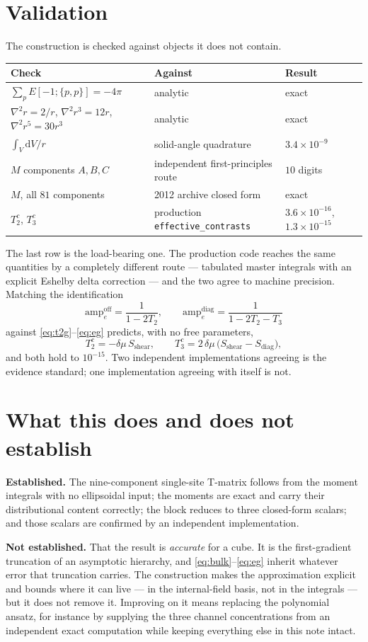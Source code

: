 \documentclass[11pt,a4paper]{article}
\newcommand{\dd}{\mathrm{d}}
\begin{document}
\section{Validation}

The construction is checked against objects it does not contain.

\begin{center}
\begin{tabular}{@{}lll@{}}
\toprule
Check & Against & Result \\
\midrule
$\sum_p E[-1;\{p,p\}]=-4\pi$ & analytic & exact \\
$\nabla^2 r=2/r$, $\nabla^2r^3=12r$, $\nabla^2r^5=30r^3$ & analytic & exact \\
$\int_V \dd V/r$ & solid-angle quadrature & $3.4\times10^{-9}$ \\
$M$ components $A,B,C$ & independent first-principles route & $10$ digits \\
$M$, all $81$ components & 2012 archive closed form & exact \\
$T_{2}^{c}$, $T_{3}^{c}$ & production \texttt{effective\_contrasts} & $3.6\times10^{-16}$,
$1.3\times10^{-15}$ \\
\bottomrule
\end{tabular}
\end{center}

The last row is the load-bearing one. The production code reaches the same
quantities by a completely different route --- tabulated master integrals with
an explicit Eshelby delta correction --- and the two agree to machine
precision. Matching the identification
\[
\text{amp}^{\text{off}}_e=\frac{1}{1-2T_2},\qquad
\text{amp}^{\text{diag}}_e=\frac{1}{1-2T_2-T_3}
\]
against \eqref{eq:t2g}--\eqref{eq:eg} predicts, with no free parameters,
\[
T_2^{c}=-\delta\mu\,S_{\text{shear}},\qquad
T_3^{c}=2\,\delta\mu\,\bigl(S_{\text{shear}}-S_{\text{diag}}\bigr),
\]
and both hold to $10^{-15}$. Two independent implementations agreeing is the
evidence standard; one implementation agreeing with itself is not.

\section{What this does and does not establish}

\textbf{Established.} The nine-component single-site T-matrix follows from the
moment integrals with no ellipsoidal input; the moments are exact and carry
their distributional content correctly; the block reduces to three closed-form
scalars; and those scalars are confirmed by an independent implementation.

\textbf{Not established.} That the result is \emph{accurate} for a cube. It is
the first-gradient truncation of an asymptotic hierarchy, and
\eqref{eq:bulk}--\eqref{eq:eg} inherit whatever error that truncation carries.
The construction makes the approximation explicit and bounds where it can
live --- in the internal-field basis, not in the integrals --- but it does not
remove it. Improving on it means replacing the polynomial ansatz, for instance
by supplying the three channel concentrations from an independent exact
computation while keeping everything else in this note intact.
\end{document}
